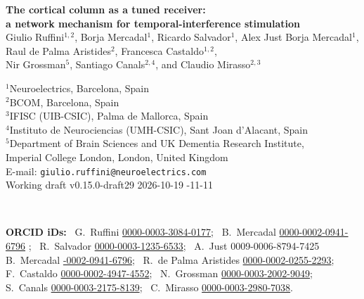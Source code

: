 \documentclass[11pt,a4paper]{article}
\newcommand{\paperver}{0.15.0-draft29} %
\providecommand{\DIFaddtex}[1]{{\protect\color{blue} \sf #1}} %
\providecommand{\DIFdeltex}[1]{{\protect\color{red} \scriptsize #1}} %
\providecommand{\DIFaddbegin}{} %
\providecommand{\DIFaddend}{} %
\providecommand{\DIFdelbegin}{} %
\providecommand{\DIFdelend}{} %
\providecommand{\DIFadd}[1]{\texorpdfstring{\DIFaddtex{#1}}{#1}} %
\providecommand{\DIFdel}[1]{\texorpdfstring{\DIFdeltex{#1}}{}} %
\begin{document}
\begin{center}
{\LARGE\bfseries The cortical column as a tuned receiver:\\[4pt]
a network mechanism for temporal-interference stimulation}\\[16pt]
{\large Giulio Ruffini$^{1,2}$, \DIFdelbegin \DIFdel{Borja Mercadal$^{1}$, }\DIFdelend Ricardo Salvador$^{1}$, \DIFdelbegin %
\DIFdel{Alex Just}\DIFdelend \DIFaddbegin \DIFadd{Borja Mercadal}\DIFaddend $^{1}$,\DIFaddbegin \\[2pt]
\DIFaddend Raul de Palma Aristides$^{2}$, Francesca Castaldo$^{1,2}$,\\[2pt]
Nir Grossman$^{5}$, Santiago Canals$^{2,4}$, and Claudio Mirasso$^{2,3}$}\\[12pt]
\begin{minipage}{0.86\textwidth}\centering\small
$^{1}$Neuroelectrics, Barcelona, Spain\\
$^{2}$BCOM, Barcelona, Spain\\
$^{3}$IFISC (UIB-CSIC), Palma de Mallorca, Spain\\
$^{4}$Instituto de Neurociencias (UMH-CSIC), Sant Joan d'Alacant, Spain\\
$^{5}$Department of Brain Sciences and UK Dementia Research Institute,\\
Imperial College London, London, United Kingdom\\[6pt]
E-mail: \texttt{giulio.ruffini@neuroelectrics.com}\\[4pt]
Working draft v\paperver\quad \DIFdelbegin \DIFdel{2026-10-19
}\DIFdelend \DIFaddbegin \DIFadd{2026-11-11
}\DIFaddend \end{minipage}\\[8pt]
\begin{minipage}{0.86\textwidth}\centering\footnotesize\color{negray}
\textbf{ORCID iDs:}\ %
G.~Ruffini \href{https://orcid.org/0000-0003-3084-0177}{0000-0003-3084-0177};\ %
\DIFdelbegin \DIFdel{B.~Mercadal }\href{https://orcid.org/0000-0002-0941-6796}{\DIFdel{0000-0002-0941-6796}}%
\DIFdel{;\ %
}\DIFdelend R.~Salvador \href{https://orcid.org/0000-0003-1235-6533}{0000-0003-1235-6533};\ %
\DIFdelbegin \DIFdel{A.~Just }%
\DIFdel{0009-0006-8794-7425}\DIFdelend \DIFaddbegin \DIFadd{B.~Mercadal }\href{https://orcid.org/0000-0002-0941-6796}{\DIFadd{0000-0002-0941-6796}\DIFaddend };\ %
R.~de Palma Aristides \href{https://orcid.org/0000-0002-0255-2293}{0000-0002-0255-2293};\ %
F.~Castaldo \href{https://orcid.org/0000-0002-4947-4552}{0000-0002-4947-4552};\ %
N.~Grossman \href{https://orcid.org/0000-0003-2002-9049}{0000-0003-2002-9049};\ %
S.~Canals \href{https://orcid.org/0000-0003-2175-8139}{0000-0003-2175-8139};\ %
C.~Mirasso \href{https://orcid.org/0000-0003-2980-7038}{0000-0003-2980-7038}.
\end{minipage}
\end{center}
\end{document}
